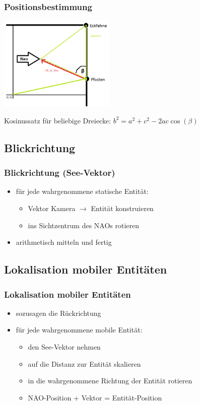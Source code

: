 \frame
{\frametitle{Positionsbestimmung}
\begin{center}\includegraphics[height=4.5cm, center]{Positionsbestimmung.png}\end{center}%
Kosinussatz für beliebige Dreiecke: $b^2 = a^2 + c^2 - 2ac \cos (\beta)$
}

\subsection{Blickrichtung}
\frame
{\frametitle{Blickrichtung (See-Vektor)}
\begin{itemize}
    \item für jede wahrgenommene statische Entität:
	\begin{itemize}
	    \item Vektor Kamera $\rightarrow$ Entität konstruieren
	    \item ins Sichtzentrum des NAOs rotieren
	\end{itemize}
    \item arithmetisch mitteln und fertig
\end{itemize}
}

\subsection{Lokalisation mobiler Entitäten}
\frame
{\frametitle{Lokalisation mobiler Entitäten}
\begin{itemize}
    \item sozusagen die Rückrichtung
    \item für jede wahrgenommene mobile Entität:
	\begin{itemize}
	    \item den See-Vektor nehmen
        \item auf die Distanz zur Entität skalieren
        \item in die wahrgenommene Richtung der Entität rotieren
        \item NAO-Position + Vektor = Entität-Position
	\end{itemize}
\end{itemize}
}

